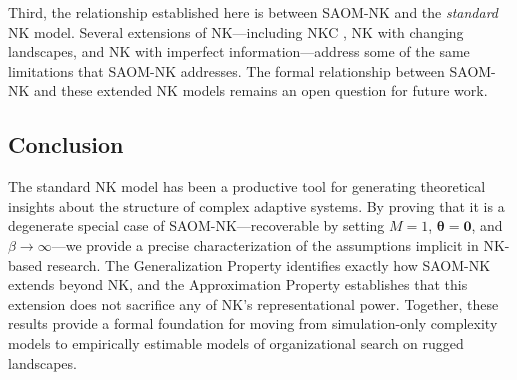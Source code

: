 \documentclass[12pt]{article}
\newcommand{\btheta}{\boldsymbol{\theta}}
\begin{document}
Third, the relationship established here is between SAOM-NK and the
\emph{standard} NK model. Several extensions of NK---including NKC
\citep{kauffman1993origins}, NK with changing landscapes, and NK with
imperfect information---address some of the same limitations that SAOM-NK
addresses. The formal relationship between SAOM-NK and these extended NK
models remains an open question for future work.

\subsection{Conclusion}

The standard NK model has been a productive tool for generating
theoretical insights about the structure of complex adaptive systems. By
proving that it is a degenerate special case of SAOM-NK---recoverable by
setting $M = 1$, $\btheta = \mathbf{0}$, and $\beta \to \infty$---we
provide a precise characterization of the assumptions implicit in NK-based
research. The Generalization Property identifies exactly how SAOM-NK extends
beyond NK, and the Approximation Property establishes that this extension
does not sacrifice any of NK's representational power. Together, these
results provide a formal foundation for moving from simulation-only
complexity models to empirically estimable models of organizational search
on rugged landscapes.



\end{document}
